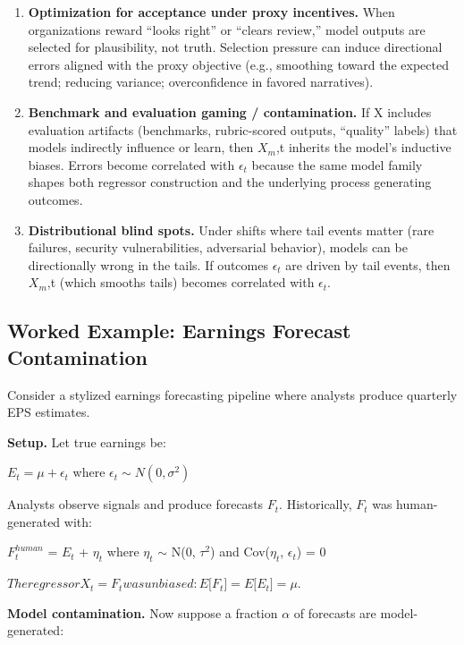 \documentclass[11pt,a4paper]{article}
\providecommand{\tightlist}{\setlength{\itemsep}{0pt}\setlength{\parskip}{0pt}}
\begin{document}
\begin{enumerate}
\def\labelenumi{\arabic{enumi}.}
\tightlist
\item
  \textbf{Optimization for acceptance under proxy incentives.} When organizations reward ``looks right'' or ``clears review,'' model outputs are selected for plausibility, not truth. Selection pressure can induce directional errors aligned with the proxy objective (e.g., smoothing toward the expected trend; reducing variance; overconfidence in favored narratives).
\item
  \textbf{Benchmark and evaluation gaming / contamination.} If X includes evaluation artifacts (benchmarks, rubric-scored outputs, ``quality'' labels) that models indirectly influence or learn, then $X_m$,t inherits the model's inductive biases. Errors become correlated with $\epsilon_{t}$ because the same model family shapes both regressor construction and the underlying process generating outcomes.
\item
  \textbf{Distributional blind spots.} Under shifts where tail events matter (rare failures, security vulnerabilities, adversarial behavior), models can be directionally wrong in the tails. If outcomes $\epsilon_{t}$ are driven by tail events, then $X_m$,t (which smooths tails) becomes correlated with $\epsilon_{t}$.
\end{enumerate}

\hypertarget{worked-example-earnings-forecast-contamination}{%
\subsection{Worked Example: Earnings Forecast Contamination}\label{worked-example-earnings-forecast-contamination}}

Consider a stylized earnings forecasting pipeline where analysts produce quarterly EPS estimates.

\textbf{Setup.} Let true earnings be:

$E_t = \mu + \epsilon_t$ where $\epsilon_t \sim N(0, \sigma^2)$

Analysts observe signals and produce forecasts $F_t$. Historically, $F_t$ was human-generated with:

$F_t^{human}$ = $E_t$ + $\eta_{t}$ where $\eta_{t}$ $\sim$ N(0, $\tau^2$) and Cov($\eta_{t}$, $\epsilon_{t}$) = 0

$The regressor X_t = F_t was unbiased: E{[}F_t{]} = E{[}E_t{]} = \mu.$

\textbf{Model contamination.} Now suppose a fraction $\alpha$ of forecasts are model-generated:
\end{document}
